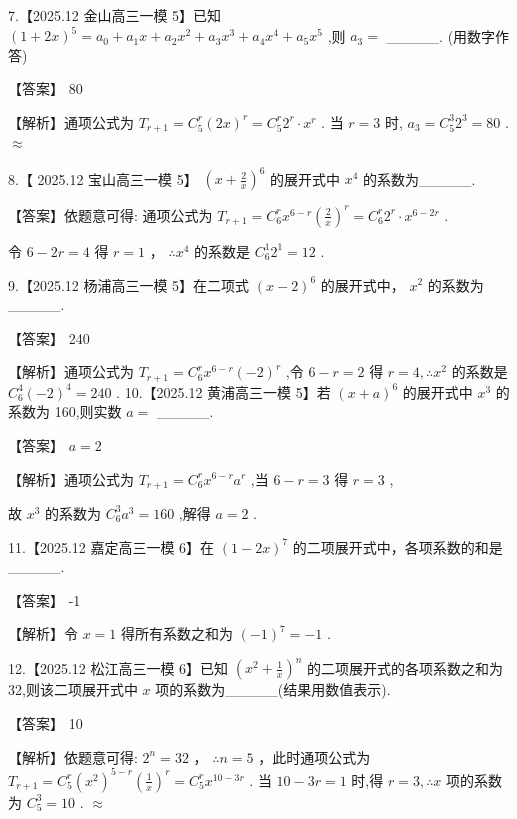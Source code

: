 \documentclass[10pt]{article}
\begin{document}
7.【2025.12 金山高三一模 5】已知 \({\left( 1 + 2x\right) }^{5} = {a}_{0} + {a}_{1}x + {a}_{2}{x}^{2} + {a}_{3}{x}^{3} + {a}_{4}{x}^{4} + {a}_{5}{x}^{5}\) ,则 \({a}_{3} =\) \_\_\_\_\_. (用数字作答)

【答案】 80

【解析】通项公式为 \({T}_{r + 1} = {C}_{5}^{r}{\left( 2x\right) }^{r} = {C}_{5}^{r}{2}^{r} \cdot  {x}^{r}\) . 当 \(r = 3\) 时, \({a}_{3} = {C}_{5}^{3}{2}^{3} = {80}\) . \(\approx\)

8.【 2025.12 宝山高三一模 5】 \({\left( x + \frac{2}{x}\right) }^{6}\) 的展开式中 \({x}^{4}\) 的系数为\_\_\_\_\_.

【答案】依题意可得: 通项公式为 \({T}_{r + 1} = {C}_{6}^{r}{x}^{6 - r}{\left( \frac{2}{x}\right) }^{r} = {C}_{6}^{r}{2}^{r} \cdot  {x}^{6 - {2r}}\) .

令 \(6 - {2r} = 4\) 得 \(r = 1\) ， \(\therefore {x}^{4}\) 的系数是 \({C}_{6}^{1}{2}^{1} = {12}\) .

9.【2025.12 杨浦高三一模 5】在二项式 \({\left( x - 2\right) }^{6}\) 的展开式中， \({x}^{2}\) 的系数为\_\_\_\_\_.

【答案】 240

【解析】通项公式为 \({T}_{r + 1} = {C}_{6}^{r}{x}^{6 - r}{\left( -2\right) }^{r}\) ,令 \(6 - r = 2\) 得 \(r = 4,\therefore {x}^{2}\) 的系数是 \({C}_{6}^{4}{\left( -2\right) }^{4} = {240}\) . 10.【2025.12 黄浦高三一模 5】若 \({\left( x + a\right) }^{6}\) 的展开式中 \({x}^{3}\) 的系数为 160,则实数 \(a =\) \_\_\_\_\_.

【答案】 \(a = 2\)

【解析】通项公式为 \({T}_{r + 1} = {C}_{6}^{r}{x}^{6 - r}{a}^{r}\) ,当 \(6 - r = 3\) 得 \(r = 3\) ,

故 \({x}^{3}\) 的系数为 \({C}_{6}^{3}{a}^{3} = {160}\) ,解得 \(a = 2\) .

11.【2025.12 嘉定高三一模 6】在 \({\left( 1 - 2x\right) }^{7}\) 的二项展开式中，各项系数的和是\_\_\_\_\_.

【答案】 -1

【解析】令 \(x = 1\) 得所有系数之和为 \({\left( -1\right) }^{7} =  - 1\) .

12.【2025.12 松江高三一模 6】已知 \({\left( {x}^{2} + \frac{1}{x}\right) }^{n}\) 的二项展开式的各项系数之和为 32,则该二项展开式中 \(x\) 项的系数为\_\_\_\_\_(结果用数值表示).

【答案】 10

【解析】依题意可得: \({2}^{n} = {32}\) ， \(\therefore n = 5\) ，此时通项公式为 \({T}_{r + 1} = {C}_{5}^{r}{\left( {x}^{2}\right) }^{5 - r}{\left( \frac{1}{x}\right) }^{r} = {C}_{5}^{r}{x}^{{10} - {3r}}\) . 当 \({10} - {3r} = 1\) 时,得 \(r = 3,\therefore x\) 项的系数为 \({C}_{5}^{3} = {10}\) . \(\approx\)
\end{document}
